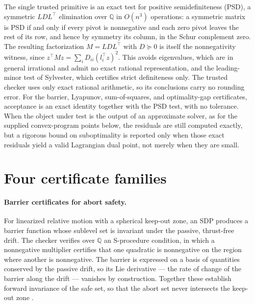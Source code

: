 \documentclass[11pt]{article}
\newcommand{\Q}{\mathbb{Q}}
\theoremstyle{plain}
\theoremstyle{remark}
\begin{document}
The single trusted primitive is an exact test for positive semidefiniteness
(PSD), a symmetric $LDL^\top$ elimination over $\Q$ in $O(n^3)$ operations: a
symmetric matrix is PSD if and only if every pivot is nonnegative and each zero
pivot leaves the rest of its row, and hence by symmetry its column, in the Schur
complement zero. The resulting factorization $M = L D L^\top$ with $D \succeq 0$
is itself the nonnegativity witness, since $z^\top M z = \sum_i D_{ii}
(l_i^\top z)^2$. This avoids eigenvalues, which are in general irrational and
admit no exact rational representation, and the leading-minor test of Sylvester,
which certifies strict definiteness only. The trusted checker uses only exact
rational arithmetic, so its conclusions carry no rounding error. For the barrier, Lyapunov, sum-of-squares, and optimality-gap
certificates, acceptance is an exact identity together with the PSD test, with no
tolerance. When the object under test is the output of an approximate solver, as
for the supplied convex-program points below, the residuals are still computed exactly, but
a rigorous bound on suboptimality is reported only when those exact residuals
yield a valid Lagrangian dual point, not merely when they are small.

\section{Four certificate families}
\label{sec:family}

\paragraph{Barrier certificates for abort safety.}
For linearized relative motion with a spherical keep-out zone, an SDP produces a
barrier function whose sublevel set is invariant under the passive, thrust-free
drift. The checker verifies over $\Q$ an S-procedure condition, in which a
nonnegative multiplier certifies that one quadratic is nonnegative on the region
where another is nonnegative. The barrier is expressed on a basis of quantities
conserved by the passive drift, so its Lie derivative --- the rate of change of
the barrier along the drift --- vanishes by construction. Together these
establish forward invariance of the safe set, so that the abort set never
intersects the keep-out zone \cite{prajna2004,ames2017}.
\end{document}
